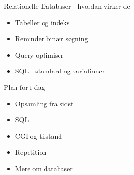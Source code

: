\documentclass[a4paper,landscape]{slides}
\begin{document}
\begin{slide}
	\begin{center} {\large 
Relationelle Databaser - hvordan virker de
	} \end{center}
	\begin{itemize} \addtolength{\itemsep}{-\baselineskip}
           \item Tabeller og indeks
           \item Reminder binær søgning
           \item Query optimiser
           \item SQL - standard og variationer
	\end{itemize}
\end{slide}

\begin{slide}
	\begin{center} {\large 
            Plan for i dag
	} \end{center}
	\begin{itemize} \addtolength{\itemsep}{-\baselineskip}
		\item Opsamling fra sidst
		\item SQL
		\item CGI og tilstand
		\item Repetition
		\item Mere om databaser
	\end{itemize}
\end{slide}
\end{document}
